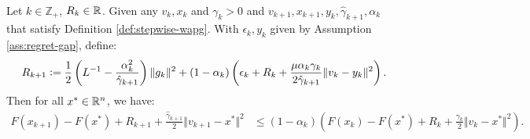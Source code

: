 \documentclass[12pt]{article}
\begin{document}
    \begin{proposition}\label{prop:stepwise-lyapunov}\;\\
        Let $k \in \mathbb Z_+$, $R_k \in \mathbb R$.
        Given any $v_k, x_k$ and $\gamma_k > 0$ and $v_{k + 1}, x_{k + 1}, y_k, \hat \gamma_{k + 1}, \alpha_k$ that satisfy Definition \ref{def:stepwise-wapg}.
        With $\epsilon_k, y_k$ given by Assumption \ref{ass:regret-gap}, define:
        \begin{align}\label{eqn:stepwise-lya-1}
            R_{k + 1}
            \vcentcolon=
            \frac{1}{2}\left(
                L^{-1} - \frac{\alpha_k^2}{\hat \gamma_{k + 1}}
            \right)\Vert g_k\Vert^2
            +
            (1 - \alpha_k)
            \left(
                \epsilon_k + R_k +
                \frac{\mu\alpha_k\gamma_k}{2\hat \gamma_{k + 1}}
                \Vert v_k - y_k\Vert^2
            \right).
        \end{align}
        Then for all $x^* \in \mathbb R^n$, we have:
        {\small
        \begin{align}\label{ineq:stepwise-lya-2}
            F(x_{k + 1}) - F(x^*) + R_{k + 1} + \frac{\hat \gamma_{k + 1}}{2}\Vert v_{k + 1} - x^*\Vert^2
            &\le
            (1 - \alpha_k)
            \left(
                F(x_k) - F(x^*) + R_k + \frac{\gamma_{k}}{2}\Vert v_k - x^*\Vert^2
            \right).
        \end{align}
        }
    \end{proposition}
\end{document}
